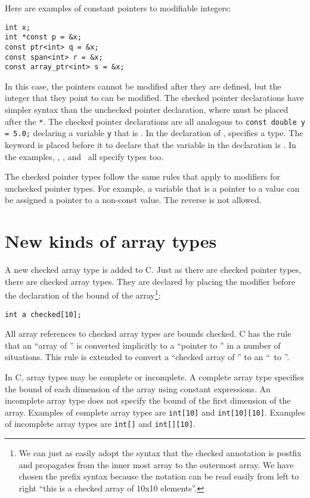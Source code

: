 Here are examples of constant pointers to modifiable integers:
\begin{verbatim}
int x;
int *const p = &x;
const ptr<int> q = &x;
const span<int> r = &x;
const array_ptr<int> s = &x;
\end{verbatim}
In this case, the pointers cannot be modified after they are defined, but 
the integer that they point to can be modified.   The checked pointer declarations 
have simpler syntax than the unchecked pointer declaration, where 
must be placed after the \verb+*+.   The checked pointer declarations are all analogous 
to \verb+const double y = 5.0;+ declaring a  variable \verb+y+ that is .
In the declaration of ,  specifies a type.
The  keyword is placed before it to declare that
the variable in the declaration is .  In the examples, \ptrint,
\spanptrint, and \arrayptrint\ all specify types too.

The checked pointer types follow the same rules that apply to modifiers for
unchecked pointer types.  For example, a variable that is a pointer to a
 value can be assigned a pointer to a non-const value.  
The reverse is not allowed.

\section{New kinds of array types}

A new checked array type is added to C. Just as there are checked pointer
types, there are checked array types. They are declared by placing the
modifier  before the declaration of the bound of the
array\footnote{We can just as easily adopt the syntax that the checked
annotation is postfix and propagates from the inner most array to the
 outermost array. We have chosen the prefix syntax because the notation
 can be read easily from left to right ``this is a checked array of
 10x10 elements''.}:
\begin{verbatim}
int a checked[10];
\end{verbatim}

All array references to checked array types are bounds checked. C has
the rule that an ``array of '' is converted implicitly to a
``pointer to '' in a number of situations. This rule is extended
to convert a ``checked array of '' to an ``\arrayptr\ 
to ''.

In C, array types may be complete or incomplete. A complete array type
specifies the bound of each dimension of the array using constant
expressions. An incomplete array type does not specify the bound of the
first dimension of the array. Examples of complete array types are
\texttt{int[10]} and \texttt{int[10][10]}. Examples of
incomplete array types are \texttt{int[]} and \texttt{int[][10]}.

